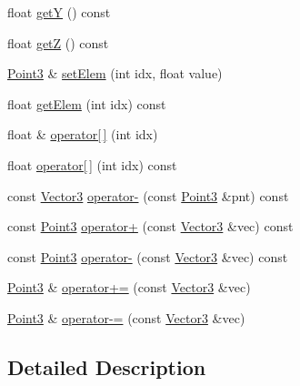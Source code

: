 \begin{DoxyCompactItemize}
\item 
float \hyperlink{classVectormath_1_1Aos_1_1Point3_a6d06ef54d34f7552680d1e7d672ab473}{get\-Y} () const 
\item 
float \hyperlink{classVectormath_1_1Aos_1_1Point3_ad83252a573e61cff750b1e93420d469f}{get\-Z} () const 
\item 
\hyperlink{classVectormath_1_1Aos_1_1Point3}{Point3} \& \hyperlink{classVectormath_1_1Aos_1_1Point3_ad526b87fcb32481172843961a24c998e}{set\-Elem} (int idx, float value)
\item 
float \hyperlink{classVectormath_1_1Aos_1_1Point3_a799aaab8cc96e46dffc1f14475d00a11}{get\-Elem} (int idx) const 
\item 
float \& \hyperlink{classVectormath_1_1Aos_1_1Point3_a9199103ca52600d52dee2852dfa56e60}{operator\mbox{[}$\,$\mbox{]}} (int idx)
\item 
float \hyperlink{classVectormath_1_1Aos_1_1Point3_a3efc9e792f42d04bfb88b440c2b7f33b}{operator\mbox{[}$\,$\mbox{]}} (int idx) const 
\item 
const \hyperlink{classVectormath_1_1Aos_1_1Vector3}{Vector3} \hyperlink{classVectormath_1_1Aos_1_1Point3_ac110665a00116cf76309f2d4a898fd92}{operator-\/} (const \hyperlink{classVectormath_1_1Aos_1_1Point3}{Point3} \&pnt) const 
\item 
const \hyperlink{classVectormath_1_1Aos_1_1Point3}{Point3} \hyperlink{classVectormath_1_1Aos_1_1Point3_abe36c3385029863afc4ec28129dd5430}{operator+} (const \hyperlink{classVectormath_1_1Aos_1_1Vector3}{Vector3} \&vec) const 
\item 
const \hyperlink{classVectormath_1_1Aos_1_1Point3}{Point3} \hyperlink{classVectormath_1_1Aos_1_1Point3_ab46ebdacfa7955ce5ba542add038c1bb}{operator-\/} (const \hyperlink{classVectormath_1_1Aos_1_1Vector3}{Vector3} \&vec) const 
\item 
\hyperlink{classVectormath_1_1Aos_1_1Point3}{Point3} \& \hyperlink{classVectormath_1_1Aos_1_1Point3_ab815d7df7f54305c47288eeef62419e4}{operator+=} (const \hyperlink{classVectormath_1_1Aos_1_1Vector3}{Vector3} \&vec)
\item 
\hyperlink{classVectormath_1_1Aos_1_1Point3}{Point3} \& \hyperlink{classVectormath_1_1Aos_1_1Point3_a96d9cf86705dd4a76051958d372819ca}{operator-\/=} (const \hyperlink{classVectormath_1_1Aos_1_1Vector3}{Vector3} \&vec)
\end{DoxyCompactItemize}


\subsection{Detailed Description}


